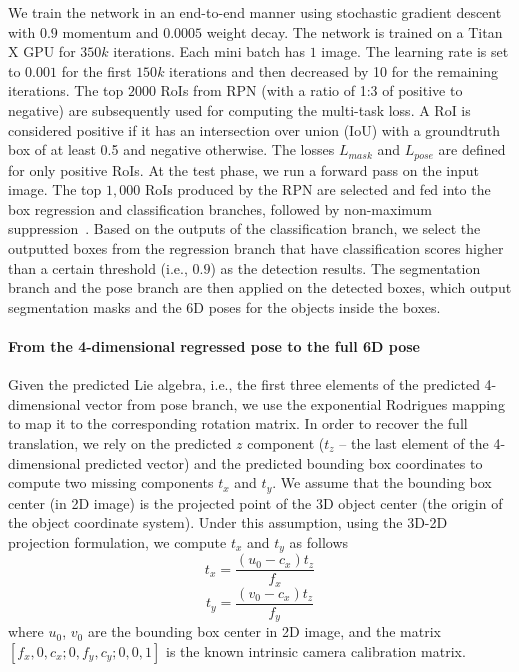 \documentclass[conference]{IEEEtran}
\newcommand\red[1]{{\color{black}#1}}
\newcommand{\iancomment}[1]{\red{IAN: #1}}
\begin{document}
We train the network in an end-to-end manner using stochastic gradient descent with $0.9$ momentum and $0.0005$ weight decay. The network is trained on a Titan X GPU for $350k$ iterations. Each mini batch has $1$ image. %
The learning rate is set to $0.001$ for the first $150k$ iterations and then decreased by 10 for the remaining iterations. The top $2000$ RoIs from RPN (with a ratio of 1:3 of positive to negative) are subsequently used for computing the multi-task loss. A RoI is considered positive if it has an intersection over union (IoU) with a groundtruth box of at least 0.5 and negative otherwise. The losses $L_{mask}$ and $L_{pose}$ are defined for only positive RoIs. %
At the test phase, we run a forward pass on the input image.  The top $1,000$ RoIs produced by the RPN are selected and fed into the box regression and classification branches, followed by non-maximum suppression~\cite{Fast-RCNN}. Based on the outputs of the classification branch, we select the outputted boxes from the regression branch that have classification scores higher than a certain threshold (i.e., $0.9$) as the detection results. The segmentation branch and the pose branch are then applied on the detected boxes, which output segmentation masks and the 6D poses for the objects inside the boxes. 

\paragraph{From the 4-dimensional regressed pose to the full 6D pose}
Given the predicted Lie algebra, i.e., the first three elements of the predicted 4-dimensional vector from pose branch, we use the exponential Rodrigues mapping~\cite{log-exp-map} to map it to the corresponding rotation matrix.  
In order to recover the full translation, we rely on the predicted $z$ component ($t_z$ -- the last element of the 4-dimensional predicted vector) and the predicted bounding box coordinates to compute two missing components $t_x$ and $t_y$. We assume that the bounding box center (in 2D image) is the projected point of the 3D object center (the origin of the object coordinate system). Under this assumption, using the 3D-2D projection formulation, we compute $t_x$ and $t_y$ as follows
\begin{equation}
t_x = \frac{(u_0 - c_x)t_z}{f_x}
\end{equation}\begin{equation}
t_y = \frac{(v_0 - c_x)t_z}{f_y}
\end{equation}
where $u_0$, $v_0$ are the bounding box center in 2D image, and the matrix $[f_x, 0, c_x; 0, f_y, c_y; 0, 0, 1]$ is the known intrinsic camera calibration matrix.
\end{document}
